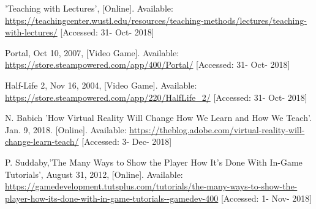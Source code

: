 \documentclass[onecolumn, draftclsnofoot,10pt, compsoc]{IEEEtran}
\begin{document}
\begin{thebibliography}{00}
 'Teaching with Lectures', [Online]. Available: \url{https://teachingcenter.wustl.edu/resources/teaching-methods/lectures/teaching-with-lectures/} [Accessed: 31- Oct- 2018]

 Portal, Oct 10, 2007, [Video Game]. Available: \url{https://store.steampowered.com/app/400/Portal/} [Accessed: 31- Oct- 2018]

 Half-Life 2, Nov 16, 2004, [Video Game]. Available: \url{https://store.steampowered.com/app/220/HalfLife\_2/} [Accessed: 31- Oct- 2018]

 N. Babich 'How Virtual Reality Will Change How We Learn and How We Teach'. Jan. 9, 2018. [Online]. Available: \url{https://theblog.adobe.com/virtual-reality-will-change-learn-teach/} [Accessed: 3- Dec- 2018]

 P. Suddaby,'The Many Ways to Show the Player How It's Done With In-Game Tutorials', August 31, 2012, [Online]. Available: \url{https://gamedevelopment.tutsplus.com/tutorials/the-many-ways-to-show-the-player-how-its-done-with-in-game-tutorials--gamedev-400} [Accessed: 1- Nov- 2018]


\end{thebibliography}
\end{document}
